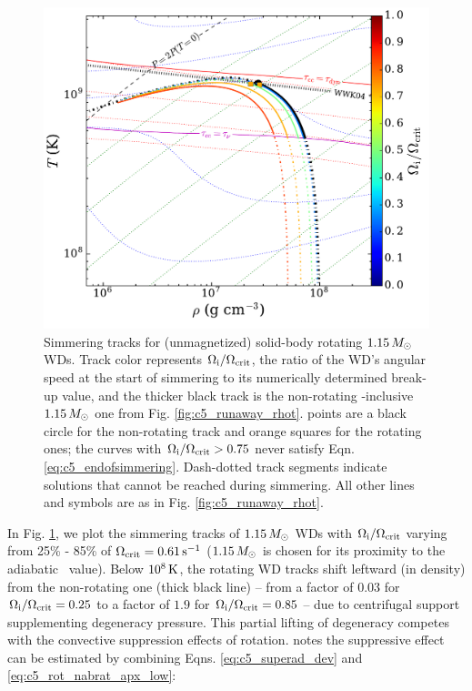\begin{figure}
\centering
\includegraphics[angle=0,width=0.8\columnwidth]{chapter5_zhu+16/figures/rot_stev_1pt15_rhot.pdf}
\caption{Simmering tracks for (unmagnetized) solid-body rotating $1.15\,\Msun$ WDs.  Track color represents $\Ominit/\Omcrit$, the ratio of the WD's angular speed at the start of simmering to its numerically determined break-up value, and the thicker black track is the non-rotating \dnabconv-inclusive $1.15\,\Msun$ one from Fig. \ref{fig:c5_runaway_rhot}.  \citeal{wooswk04} points are a black circle for the non-rotating track and orange squares for the rotating ones; the curves with $\Ominit/\Omcrit > 0.75$ never satisfy Eqn. \ref{eq:c5_endofsimmering}.  Dash-dotted track segments indicate solutions that cannot be reached during simmering.  All other lines and symbols are as in Fig. \ref{fig:c5_runaway_rhot}.}
\label{fig:c5_rot_stev_1pt15_rhot}
\end{figure}


In Fig. \ref{fig:c5_rot_stev_1pt15_rhot}, we plot the simmering tracks of $1.15\,\Msun$ WDs with $\Ominit/\Omcrit$ varying from 25\% - 85\% of $\Omcrit = 0.61\,\mrm{s}^{-1}$ ($1.15\,\Msun$ is chosen for its proximity to the adiabatic \Mcrit\ value).  Below $10^{8}\,\mathrm{K}$, the rotating WD tracks shift leftward (in density) from the non-rotating one (thick black line) -- from a factor of $0.03$ for $\Ominit/\Omcrit = 0.25$ to a factor of $1.9$ for $\Ominit/\Omcrit = 0.85$ -- due to centrifugal support supplementing degeneracy pressure.  This partial lifting of degeneracy competes with the convective suppression effects of rotation.  \citeal{stev79} notes the suppressive effect can be estimated by combining Eqns. \ref{eq:c5_superad_dev} and \ref{eq:c5_rot_nabrat_apx_low}:

